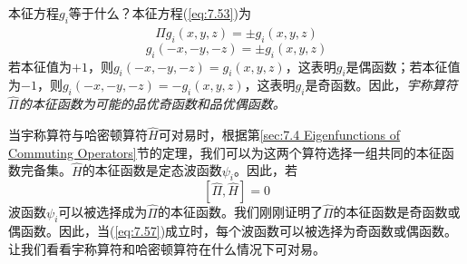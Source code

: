     本征方程$g_i$等于什么？本征方程(\ref{eq:7.53})为
    \begin{equation*}
        \hat{\Pi}g_i\left(x,y,z\right) = \pm g_i\left(x,y,z\right)
    \end{equation*}
    \begin{equation*}
        g_i\left(-x,-y,-z\right) = \pm g_i\left(x,y,z\right)
    \end{equation*}
    若本征值为$+1$，则$g_i\left(-x,-y,-z\right) = g_i\left(x,y,z\right)$，这表明$g_i$是偶函数；若本征值为$-1$，则$g_i\left(-x,-y,-z\right) = -g_i\left(x,y,z\right)$，这表明$g_i$是奇函数。因此，\textit{宇称算符$\hat{\Pi}$的本征函数为可能的品优奇函数和品优偶函数。}

    当宇称算符与哈密顿算符$\hat{H}$可对易时，根据第\ref{sec:7.4 Eigenfunctions of Commuting Operators}节的定理，我们可以为这两个算符选择一组共同的本征函数完备集。$\hat{H}$的本征函数是定态波函数$\psi_i$。因此，若
    \begin{equation}
        \left[\hat{\Pi}, \hat{H}\right] = 0
        \label{eq:7.57}
    \end{equation}
    波函数$\psi_i$可以被选择成为$\hat{\Pi}$的本征函数。我们刚刚证明了$\hat{\Pi}$的本征函数是奇函数或偶函数。因此，当(\ref{eq:7.57})成立时，每个波函数可以被选择为奇函数或偶函数。让我们看看宇称算符和哈密顿算符在什么情况下可对易。

